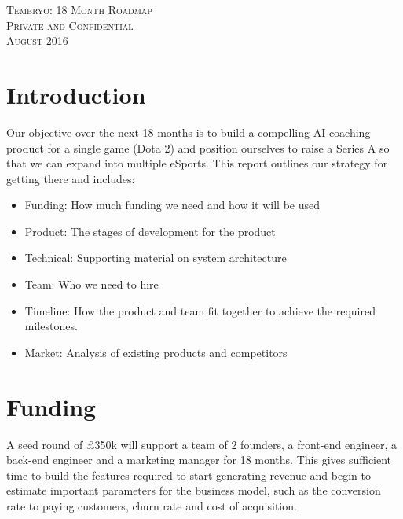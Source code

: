 \documentclass[12pt]{article} %
\let\oldsection\section
\renewcommand\section{\clearpage\oldsection}
\begin{document}
\begin{titlepage}


    \centering

    \vspace*{4cm}
  {\scshape\huge Tembryo: 18 Month Roadmap}\\
  
\vspace*{\fill}
	 {\scshape\huge\Large Private and Confidential\\
	 August 2016}

\end{titlepage}


\tableofcontents{}


\doublespacing
\setlength{\parindent}{0pt}

\section{Introduction}

Our objective over the next 18 months is to build a compelling AI coaching product for a single game (Dota 2) and position ourselves to raise a Series A so that we can expand into multiple eSports. This report outlines our strategy for getting there and includes:
\begin{itemize}  
\item Funding: How much funding we need and how it will be used
\item Product: The stages of development for the product 
\item Technical: Supporting material on system architecture
\item Team: Who we need to hire
\item Timeline: How the product and team fit together to achieve the required milestones.
\item Market: Analysis of existing products and competitors
\end{itemize}

\section{Funding}

A seed round of \pounds350k will support a team of 2 founders, a front-end engineer, a back-end engineer and a marketing manager for 18 months. This gives sufficient time to build the features required to start generating revenue and begin to estimate important parameters for the business model, such as the conversion rate to paying customers, churn rate and cost of acquisition.\\
\end{document}
